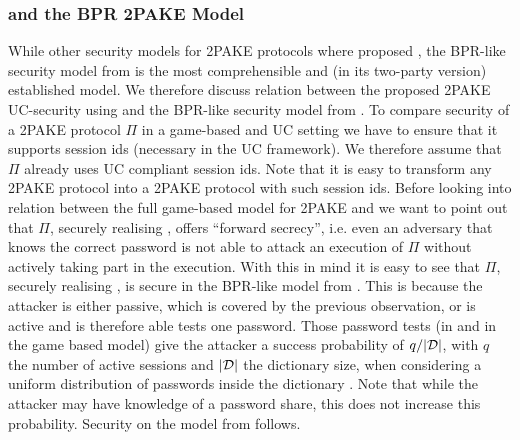 \subsubsection{\FTWOPAKE and the BPR 2PAKE Model}
While other security models for 2PAKE protocols where proposed \cite{SzydloK05}, the BPR-like security model from \cite{KatzMTB05} is the most comprehensible and (in its two-party version) established model.
We therefore discuss relation between the proposed 2PAKE UC-security using \FTWOPAKE and the BPR-like security model from \cite{KatzMTB05}.
To compare security of a 2PAKE protocol $\Pi$ in a game-based and UC setting we have to ensure that it supports session ids (necessary in the UC framework).
We therefore assume that $\Pi$ already uses UC compliant session ids.
Note that it is easy to transform any 2PAKE protocol into a 2PAKE protocol with such session ids.
Before looking into relation between the full game-based model for 2PAKE and \FTWOPAKE we want to point out that $\Pi$, securely realising \FTWOPAKE, offers ``forward secrecy'', i.e. even an adversary that knows the correct password is not able to attack an execution of $\Pi$ without actively taking part in the execution.
With this in mind it is easy to see that $\Pi$, securely realising \FTWOPAKE, is secure in the BPR-like model from \cite{KatzMTB05}.
This is because the attacker is either passive, which is covered by the previous observation, or is active and is therefore able tests one password.
Those password tests (\TestPwd in \FTWOPAKE and \Send in the game based model) give the attacker a success probability of $q/|\mathcal{D}|$, with $q$ the number of active sessions and $|\mathcal{D}|$ the dictionary size, when considering a uniform distribution of passwords inside the dictionary \cD.
Note that while the attacker may have knowledge of a password share, this does not increase this probability.
Security on the model from \cite{KatzMTB05} follows.

